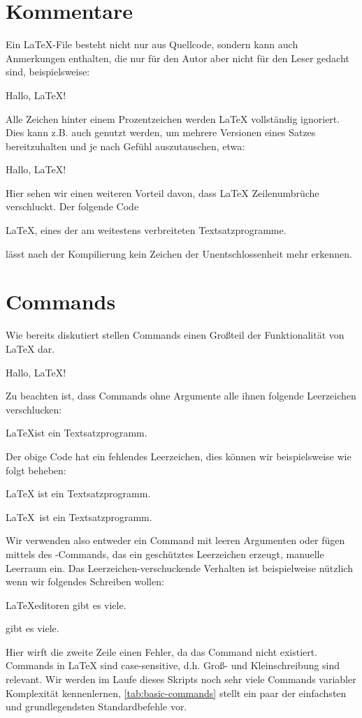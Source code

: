 \section{Kommentare}
Ein \LaTeX{}-File besteht nicht nur aus Quellcode, sondern kann auch Anmerkungen enthalten, die nur für den Autor aber nicht für den Leser gedacht sind, beispielsweise:
\begin{latexlisting}
	Hallo, LaTeX!
\end{latexlisting}
Alle Zeichen hinter einem Prozentzeichen werden LaTeX vollständig ignoriert.
Dies kann z.B. auch genutzt werden, um mehrere Versionen eines Satzes bereitzuhalten und je nach Gefühl auszutauschen, etwa:
\begin{latexlisting}
	Hallo, LaTeX!
\end{latexlisting}
Hier sehen wir einen weiteren Vorteil davon, dass \LaTeX{} Zeilenumbrüche verschluckt.
Der folgende Code
\begin{latexlisting}
	LaTeX, eines der
	am weitestens verbreiteten %
	Textsatzprogramme.
\end{latexlisting}
lässt nach der Kompilierung kein Zeichen der Unentschlossenheit mehr erkennen.

\section{Commands}
Wie bereits diskutiert stellen Commands einen Großteil der Funktionalität von \LaTeX{} dar.
\begin{latexlisting}
	Hallo, \LaTeX!
\end{latexlisting}
Zu beachten ist, dass Commands ohne Argumente alle ihnen folgende Leerzeichen verschlucken:
\begin{latexlisting}
	\LaTeX ist ein Textsatzprogramm.
\end{latexlisting}
Der obige Code hat ein fehlendes Leerzeichen, dies können wir beispielsweise wie folgt beheben:
\begin{latexlisting}
	\LaTeX{} ist ein Textsatzprogramm.

	\LaTeX\ ist ein Textsatzprogramm.
\end{latexlisting}
Wir verwenden also entweder ein Command mit leeren Argumenten oder fügen mittels des \latexcommand{ }-Commands, das ein geschütztes Leerzeichen erzeugt, manuelle Leerraum ein.
Das Leerzeichen-verschuckende Verhalten ist beispielweise nützlich wenn wir folgendes Schreiben wollen:
\begin{latexlisting}
	\LaTeX editoren gibt es viele.

	\LaTeXeditoren gibt es viele.
\end{latexlisting}
Hier wirft die zweite Zeile einen Fehler, da das Command  nicht existiert.
Commands in \LaTeX{} sind case-sensitive, d.h. Groß- und Kleinschreibung sind relevant.
Wir werden im Laufe dieses Skripts noch sehr viele Commands variabler Komplexität kennenlernen, \autoref{tab:basic-commands} stellt ein paar der einfachsten und grundlegendsten Standardbefehle vor.


